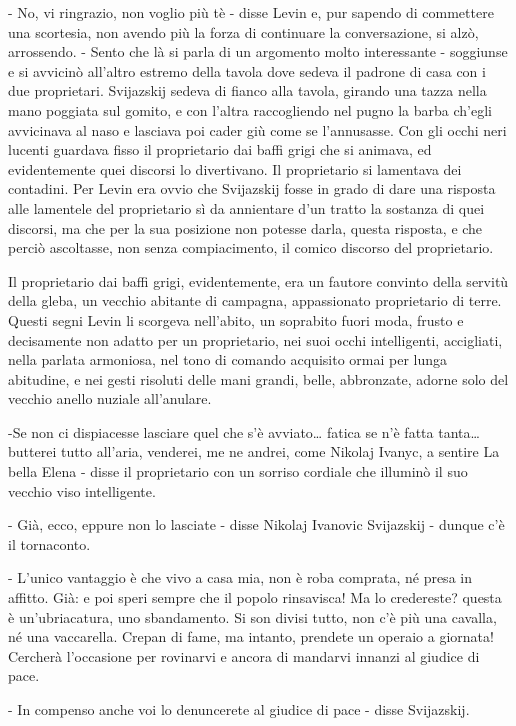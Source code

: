 - No, vi ringrazio, non voglio più tè - disse Levin e, pur sapendo di commettere una scortesia, non avendo più la forza di continuare la conversazione, si alzò, arrossendo. - Sento che là si parla di un argomento molto interessante - soggiunse e si avvicinò all'altro estremo della tavola dove sedeva il padrone di casa con i due proprietari. Svijazskij sedeva di fianco alla tavola, girando una tazza nella mano poggiata sul gomito, e con l'altra raccogliendo nel pugno la barba ch'egli avvicinava al naso e lasciava poi cader giù come se l'annusasse. Con gli occhi neri lucenti guardava fisso il proprietario dai baffi grigi che si animava, ed evidentemente quei discorsi lo divertivano. Il proprietario si lamentava dei contadini. Per Levin era ovvio che Svijazskij fosse in grado di dare una risposta alle lamentele del proprietario sì da annientare d'un tratto la sostanza di quei discorsi, ma che per la sua posizione non potesse darla, questa risposta, e che perciò ascoltasse, non senza compiacimento, il comico discorso del proprietario. 

Il proprietario dai baffi grigi, evidentemente, era un fautore convinto della servitù della gleba, un vecchio abitante di campagna, appassionato proprietario di terre. Questi segni Levin li scorgeva nell'abito, un soprabito fuori moda, frusto e decisamente non adatto per un proprietario, nei suoi occhi intelligenti, accigliati, nella parlata armoniosa, nel tono di comando acquisito ormai per lunga abitudine, e nei gesti risoluti delle mani grandi, belle, abbronzate, adorne solo del vecchio anello nuziale all'anulare. 

-Se non ci dispiacesse lasciare quel che s'è avviato\ldots{} fatica se n'è fatta tanta\ldots{} butterei tutto all'aria, venderei, me ne andrei, come Nikolaj Ivanyc, a sentire La bella Elena - disse il proprietario con un sorriso cordiale che illuminò il suo vecchio viso intelligente. 

- Già, ecco, eppure non lo lasciate - disse Nikolaj Ivanovic Svijazskij - dunque c'è il tornaconto. 

- L'unico vantaggio è che vivo a casa mia, non è roba comprata, né presa in affitto. Già: e poi speri sempre che il popolo rinsavisca! Ma lo credereste? questa è un'ubriacatura, uno sbandamento. Si son divisi tutto, non c'è più una cavalla, né una vaccarella. Crepan di fame, ma intanto, prendete un operaio a giornata! Cercherà l'occasione per rovinarvi e ancora di mandarvi innanzi al giudice di pace. 

- In compenso anche voi lo denuncerete al giudice di pace - disse Svijazskij. 

